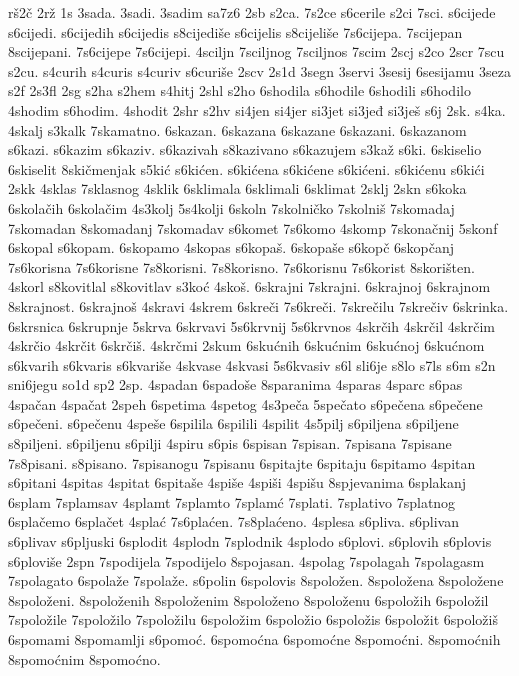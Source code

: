 {rš2č
2rž
1s
3sada.
3sadi.
3sadim
sa7z6
2sb
s2ca.
7s2ce
s6cerile
s2ci
7sci.
s6cijede
s6cijedi.
s6cijedih
s6cijedis
s8cijediše
s6cijelis
s8cijeliše
7s6cijepa.
7scijepan
8scijepani.
7s6cijepe
7s6cijepi.
4sciljn
7sciljnog
7sciljnos
7scim
2scj
s2co
2scr
7scu
s2cu.
s4curih
s4curis
s4curiv
s6curiše
2scv
2s1d
3segn
3servi
3sesij
6sesijamu
3seza
s2f
2s3fl
2sg
s2ha
s2hem
s4hitj
2shl
s2ho
6shodila
s6hodile
6shodili
s6hodilo
4shodim
s6hodim.
4shodit
2shr
s2hv
si4jen
si4jer
si3jet
si3jeđ
si3ješ
s6j
2sk.
s4ka.
4skalj
s3kalk
7skamatno.
6skazan.
6skazana
6skazane
6skazani.
6skazanom
s6kazi.
s6kazim
s6kaziv.
s6kazivah
s8kazivano
s6kazujem
s3kaž
s6ki.
6skiselio
6skiselit
8skičmenjak
s5kić
s6kićen.
s6kićena
s6kićene
s6kićeni.
s6kićenu
s6kići
2skk
4sklas
7sklasnog
4sklik
6sklimala
6sklimali
6sklimat
2sklj
2skn
s6koka
6skolačih
6skolačim
4s3kolj
5s4kolji
6skoln
7skolničko
7skolniš
7skomadaj
7skomadan
8skomadanj
7skomadav
s6komet
7s6komo
4skomp
7skonačnij
5skonf
6skopal
s6kopam.
6skopamo
4skopas
s6kopaš.
6skopaše
s6kopč
6skopčanj
7s6korisna
7s6korisne
7s8korisni.
7s8korisno.
7s6korisnu
7s6korist
8skorišten.
4skorl
s8kovitlal
s8kovitlav
s3koć
4skoš.
6skrajni
7skrajni.
6skrajnoj
6skrajnom
8skrajnost.
6skrajnoš
4skravi
4skrem
6skreči
7s6kreči.
7skrečilu
7skrečiv
6skrinka.
6skrsnica
6skrupnje
5skrva
6skrvavi
5s6krvnij
5s6krvnos
4skrčih
4skrčil
4skrčim
4skrčio
4skrčit
6skrčiš.
4skrčmi
2skum
6skućnih
6skućnim
6skućnoj
6skućnom
s6kvarih
s6kvaris
s6kvariše
4skvase
4skvasi
5s6kvasiv
s6l
sli6je
s8lo
s7ls
s6m
s2n
sni6jegu
so1d
sp2
2sp.
4spadan
6spadoše
8sparanima
4sparas
4sparc
s6pas
4spačan
4spačat
2speh
6spetima
4spetog
4s3peča
5spečato
s6pečena
s6pečene
s6pečeni.
s6pečenu
4speše
6spilila
6spilili
4spilit
4s5pilj
s6piljena
s6piljene
s8piljeni.
s6piljenu
s6pilji
4spiru
s6pis
6spisan
7spisan.
7spisana
7spisane
7s8pisani.
s8pisano.
7spisanogu
7spisanu
6spitajte
6spitaju
6spitamo
4spitan
s6pitani
4spitas
4spitat
6spitaše
4spiše
4spiši
4spišu
8spjevanima
6splakanj
6splam
7splamsav
4splamt
7splamto
7splamć
7splati.
7splativo
7splatnog
6splačemo
6splačet
4splać
7s6plaćen.
7s8plaćeno.
4splesa
s6pliva.
s6plivan
s6plivav
s6pljuski
6splodit
4splodn
7splodnik
4splodo
s6plovi.
s6plovih
s6plovis
s6ploviše
2spn
7spodijela
7spodijelo
8spojasan.
4spolag
7spolagah
7spolagasm
7spolagato
6spolaže
7spolaže.
s6polin
6spolovis
8spoložen.
8spoložena
8spoložene
8spoloženi.
8spoloženih
8spoloženim
8spoloženo
8spoloženu
6spoložih
6spoložil
7spoložile
7spoložilo
7spoložilu
6spoložim
6spoložio
6spoložis
6spoložit
6spoložiš
6spomami
8spomamlji
s6pomoć.
6spomoćna
6spomoćne
8spomoćni.
8spomoćnih
8spomoćnim
8spomoćno.
}
